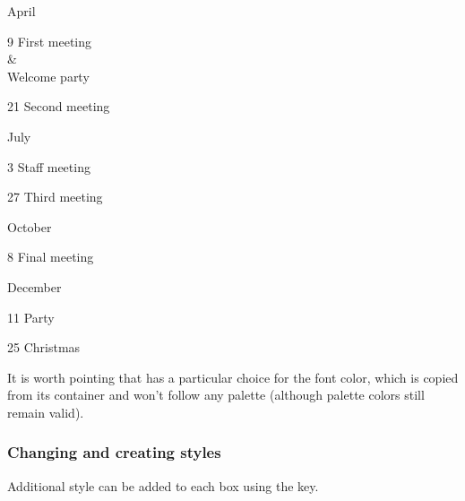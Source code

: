 \documentclass[a4paper, 11pt]{article}
\begin{document}
\begin{example}{}
    \begin{PLTBoxRaster}[month schedule, palette = sliced-citrus]
        \item [April]
        \begin{PLTBoxRaster}
            \item [9] First meeting\\\&\\Welcome party
            \item [21] Second meeting
        \end{PLTBoxRaster}
        \item [July]
        \begin{PLTBoxRaster}
            \item [3] Staff meeting
            \item [27] Third meeting
        \end{PLTBoxRaster}
        \item [October]
        \begin{PLTBoxRaster}
            \item [8] Final meeting
        \end{PLTBoxRaster}
        \item [December]
        \begin{PLTBoxRaster}
            \item [11] Party
            \item [25] Christmas
        \end{PLTBoxRaster}
    \end{PLTBoxRaster}
\end{example}

It is worth pointing that  has a particular choice for the font color, which is copied from its container and won't follow any palette (although palette colors still remain valid).



\subsubsection{Changing and creating styles}

Additional style can be added to each box using the  key.
\end{document}
